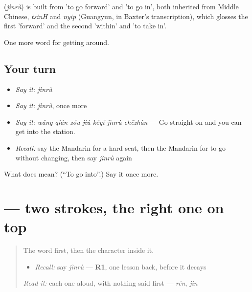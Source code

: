 \begin{cousinweb}
\textbf{} (\emph{jìnrù}) is built from  'to go forward' and  'to go in', both inherited from Middle Chinese, \emph{tsinH} and \emph{nyip} (Guangyun, in Baxter's transcription), which glosses the first 'forward' and the second 'within' and 'to take in'.
\end{cousinweb}

\begin{grammarlens}[title={What you've built}]
One more word for getting around.
\end{grammarlens}

\subsection*{Your turn}
\begin{itemize}
\raggedright
  \item \emph{Say it:} \emph{jìnrù}
  \item \emph{Say it:} \emph{jìnrù}, once more
  \item \emph{Say it:} \emph{wǎng qián zǒu jiù kěyǐ jìnrù chēzhàn} — Go straight on and you can get into the station.
  \item \emph{Recall:} say the Mandarin for a hard seat, then the Mandarin for to go without changing, then say \emph{jìnrù} again
\end{itemize}

\begin{tcolorbox}[breakable,colback=teal!4,colframe=teal!35!black,title={Before you move on}]
What does  mean? (\textquotedblleft{}To go into\textquotedblright{}.) Say it once more.
\end{tcolorbox}
\section[\texorpdfstring{\zh{入} (rù)}{入 (rù)}]{ — two strokes, the right one on top}

\label{lesson:ZH-W405-ru-enter}



\begin{quote}
The word first, then the character inside it.

\begin{itemize}
\raggedright
  \item \emph{Recall:} say \emph{jìnrù} — \textbf{R1}, one lesson back, before it decays
\end{itemize}

\begin{quote}
 
\end{quote}

\emph{Read it:} each one aloud, with nothing said first — \emph{rén}, \emph{jìn}
\end{quote}

